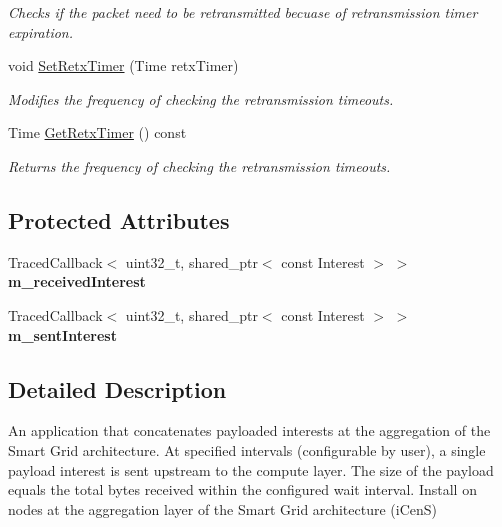 \begin{DoxyCompactItemize}
\begin{DoxyCompactList}\small\item\em Checks if the packet need to be retransmitted becuase of retransmission timer expiration. \end{DoxyCompactList}\item 
void \hyperlink{classns3_1_1ndn_1_1Aggregator_a23c3235319dd497a4b75575ad4044cf5}{Set\+Retx\+Timer} (Time retx\+Timer)
\begin{DoxyCompactList}\small\item\em Modifies the frequency of checking the retransmission timeouts. \end{DoxyCompactList}\item 
Time \hyperlink{classns3_1_1ndn_1_1Aggregator_adc26b819bc5c83308e38886b3f6757e3}{Get\+Retx\+Timer} () const
\begin{DoxyCompactList}\small\item\em Returns the frequency of checking the retransmission timeouts. \end{DoxyCompactList}\end{DoxyCompactItemize}
\subsection*{Protected Attributes}
\begin{DoxyCompactItemize}
\item 
Traced\+Callback$<$ uint32\+\_\+t, shared\+\_\+ptr$<$ const Interest $>$ $>$ {\bfseries m\+\_\+received\+Interest}\hypertarget{classns3_1_1ndn_1_1Aggregator_aef2e8414ca6a37b1c0f6b6b8caa42050}{}\label{classns3_1_1ndn_1_1Aggregator_aef2e8414ca6a37b1c0f6b6b8caa42050}

\item 
Traced\+Callback$<$ uint32\+\_\+t, shared\+\_\+ptr$<$ const Interest $>$ $>$ {\bfseries m\+\_\+sent\+Interest}\hypertarget{classns3_1_1ndn_1_1Aggregator_a350cfe270049c914eee947803b11503f}{}\label{classns3_1_1ndn_1_1Aggregator_a350cfe270049c914eee947803b11503f}

\end{DoxyCompactItemize}


\subsection{Detailed Description}
An application that concatenates payloaded interests at the aggregation of the Smart Grid architecture. At specified intervals (configurable by user), a single payload interest is sent upstream to the compute layer. The size of the payload equals the total bytes received within the configured wait interval. Install on nodes at the aggregation layer of the Smart Grid architecture (i\+CenS) 

